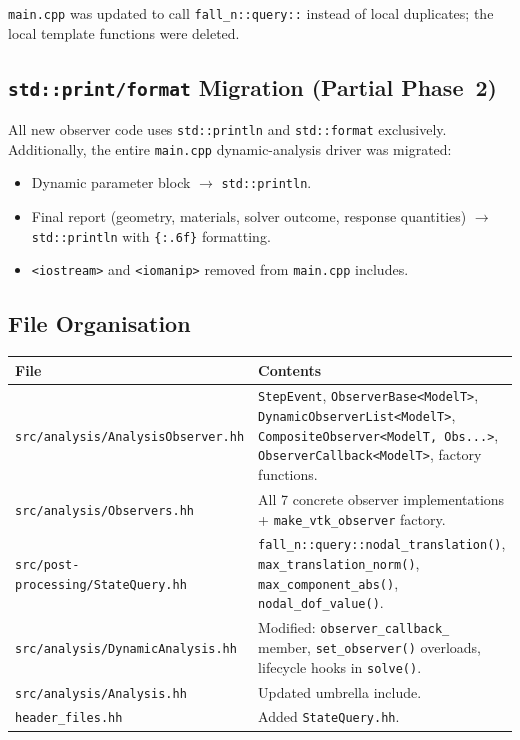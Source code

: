 \texttt{main.cpp} was updated to call \texttt{fall\_n::query::} instead
of local duplicates; the local template functions were deleted.

\subsection{\texttt{std::print/format} Migration (Partial Phase~2)}
\label{sec:impl-print-migration}

All new observer code uses \texttt{std::println} and
\texttt{std::format} exclusively.  Additionally, the entire
\texttt{main.cpp} dynamic-analysis driver was migrated:
\begin{itemize}
  \item Dynamic parameter block $\to$ \texttt{std::println}.
  \item Final report (geometry, materials, solver outcome, response
        quantities) $\to$ \texttt{std::println} with
        \texttt{\{:.6f\}} formatting.
  \item \texttt{<iostream>} and \texttt{<iomanip>} removed from
        \texttt{main.cpp} includes.
\end{itemize}

\subsection{File Organisation}
\label{sec:impl-file-org}

\begin{center}
\small
\begin{tabular}{lp{8cm}}
\toprule
\textbf{File} & \textbf{Contents} \\
\midrule
\texttt{src/analysis/AnalysisObserver.hh} &
  \texttt{StepEvent}, \texttt{ObserverBase<ModelT>},
  \texttt{DynamicObserverList<ModelT>},
  \texttt{CompositeObserver<ModelT, Obs...>},
  \texttt{ObserverCallback<ModelT>},
  factory functions. \\
\texttt{src/analysis/Observers.hh} &
  All 7 concrete observer implementations +
  \texttt{make\_vtk\_observer} factory. \\
\texttt{src/post-processing/StateQuery.hh} &
  \texttt{fall\_n::query::nodal\_translation()},
  \texttt{max\_translation\_norm()},
  \texttt{max\_component\_abs()},
  \texttt{nodal\_dof\_value()}. \\
\texttt{src/analysis/DynamicAnalysis.hh} &
  Modified: \texttt{observer\_callback\_} member,
  \texttt{set\_observer()} overloads,
  lifecycle hooks in \texttt{solve()}. \\
\texttt{src/analysis/Analysis.hh} &
  Updated umbrella include. \\
\texttt{header\_files.hh} &
  Added \texttt{StateQuery.hh}. \\
\bottomrule
\end{tabular}
\end{center}

